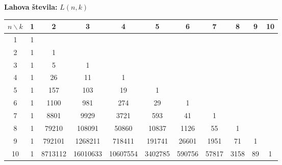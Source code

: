 \documentclass[a4paper,oneside,12pt]{article}
\newenvironment{description*}%
{
\begin{description}
\setlength{\itemsep}{0pt}
\setlength{\parskip}{2pt}
}
{\end{description}}
\begin{document}
\begin{description*}
{    \textbf{Lahova števila:} $L(n, k)$ \\
    \begin{tabular}{|*{11}{c|}}
      \hline
      $n \backslash k$ & 1&2&3&4&5&6&7&8&9&10 \\ \hline
      1 & 1 &  &  &  &  &  &  &  &  & \\ \hline
      2 & 1 & 1 &  &  &  &  &  &  &  & \\ \hline
      3 & 1 & 5 & 1 &  &  &  &  &  &  & \\ \hline
      4 & 1 & 26 & 11 & 1 &  &  &  &  &  & \\ \hline
      5 & 1 & 157 & 103 & 19 & 1 &  &  &  &  & \\ \hline
      6 & 1 & 1100 & 981 & 274 & 29 & 1 &  &  &  & \\ \hline
      7 & 1 & 8801 & 9929 & 3721 & 593 & 41 & 1 &  &  & \\ \hline
      8 & 1 & 79210 & 108091 & 50860 & 10837 & 1126 & 55 & 1 &  & \\ \hline
      9 & 1 & 792101 & 1268211 & 718411 & 191741 & 26601 & 1951 & 71 & 1 & \\ \hline
      10 & 1 & 8713112 & 16010633 & 10607554 & 3402785 & 590756 & 57817 & 3158 & 89 & 1\\ \hline
    \end{tabular}

}
\end{description*}
\end{document}
